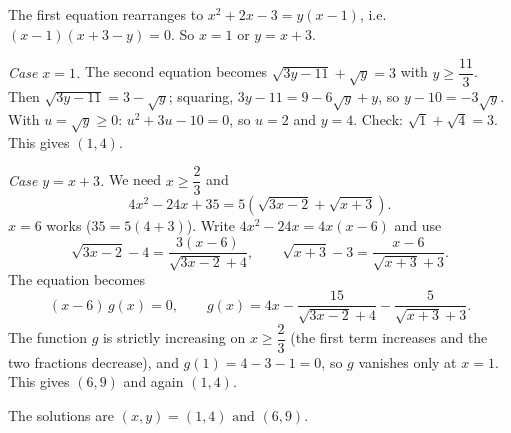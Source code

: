 The first equation rearranges to $x^2+2x-3=y(x-1)$, i.e. $(x-1)(x+3-y)=0$. So $x=1$ or $y=x+3$.

\emph{Case $x=1$.} The second equation becomes $\sqrt{3y-11}+\sqrt y=3$ with $y\ge\dfrac{11}3$. Then $\sqrt{3y-11}=3-\sqrt y$; squaring, $3y-11=9-6\sqrt y+y$, so $y-10=-3\sqrt y$. With $u=\sqrt y\ge0$: $u^2+3u-10=0$, so $u=2$ and $y=4$. Check: $\sqrt1+\sqrt4=3$. This gives $(1,4)$.

\emph{Case $y=x+3$.} We need $x\ge\dfrac23$ and
\[4x^2-24x+35=5\left(\sqrt{3x-2}+\sqrt{x+3}\right).\]
$x=6$ works ($35=5(4+3)$). Write $4x^2-24x=4x(x-6)$ and use
\[\sqrt{3x-2}-4=\dfrac{3(x-6)}{\sqrt{3x-2}+4},\qquad\sqrt{x+3}-3=\dfrac{x-6}{\sqrt{x+3}+3}.\]
The equation becomes
\[(x-6)\,g(x)=0,\qquad g(x)=4x-\dfrac{15}{\sqrt{3x-2}+4}-\dfrac{5}{\sqrt{x+3}+3}.\]
The function $g$ is strictly increasing on $x\ge\dfrac23$ (the first term increases and the two fractions decrease), and $g(1)=4-3-1=0$, so $g$ vanishes only at $x=1$. This gives $(6,9)$ and again $(1,4)$.

The solutions are $\boxed{(x,y)=(1,4)\text{ and }(6,9)}$.
